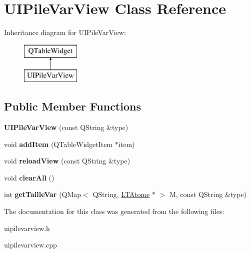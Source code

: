 \hypertarget{class_u_i_pile_var_view}{}\section{U\+I\+Pile\+Var\+View Class Reference}
\label{class_u_i_pile_var_view}
Inheritance diagram for U\+I\+Pile\+Var\+View\+:\begin{figure}[H]
\begin{center}
\leavevmode
\includegraphics[height=2.000000cm]{class_u_i_pile_var_view}
\end{center}
\end{figure}
\subsection*{Public Member Functions}
\begin{DoxyCompactItemize}
\item 
{\bfseries U\+I\+Pile\+Var\+View} (const Q\+String \&type)\hypertarget{class_u_i_pile_var_view_ab96eea7eb68e57d26913d9d399fda59f}{}\label{class_u_i_pile_var_view_ab96eea7eb68e57d26913d9d399fda59f}

\item 
void {\bfseries add\+Item} (Q\+Table\+Widget\+Item $\ast$item)\hypertarget{class_u_i_pile_var_view_a3efd6e5071b4b44783bc5c82f148831c}{}\label{class_u_i_pile_var_view_a3efd6e5071b4b44783bc5c82f148831c}

\item 
void {\bfseries reload\+View} (const Q\+String \&type)\hypertarget{class_u_i_pile_var_view_a1f2f05b68686c4e3430e433b6ab68e47}{}\label{class_u_i_pile_var_view_a1f2f05b68686c4e3430e433b6ab68e47}

\item 
void {\bfseries clear\+All} ()\hypertarget{class_u_i_pile_var_view_ae3f68f2884da3ac690c88e431bb9b39b}{}\label{class_u_i_pile_var_view_ae3f68f2884da3ac690c88e431bb9b39b}

\item 
int {\bfseries get\+Taille\+Var} (Q\+Map$<$ Q\+String, \hyperlink{class_l_t_atome}{L\+T\+Atome} $\ast$ $>$ M, const Q\+String \&type)\hypertarget{class_u_i_pile_var_view_ab875fd0b94e335b7a07e5a22d438108e}{}\label{class_u_i_pile_var_view_ab875fd0b94e335b7a07e5a22d438108e}

\end{DoxyCompactItemize}


The documentation for this class was generated from the following files\+:\begin{DoxyCompactItemize}
\item 
uipilevarview.\+h\item 
uipilevarview.\+cpp\end{DoxyCompactItemize}
